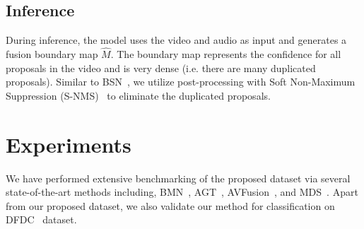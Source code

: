 \documentclass[conference, a4paper]{IEEEtran}
\makeatletter
\newcommand*{\ie}{i.e.\@\xspace}
\makeatother
\begin{document}
\begin{table*}
\centering
\caption{\textbf{Temporal forgery localization results on the subset (see Section~\ref{sec:experiments} for details) of the proposed dataset.} The visual-only version of the proposed method uses the output from the video boundary matching layer (see Figure~\ref{fig:model} for details), showing the performance when using only the video modality.}
\label{tab:subset}
\end{table*}    

\subsection{Inference}
During inference, the model uses the video and audio as input and generates a fusion boundary map $\hat{M}$. The boundary map represents the confidence for all proposals in the video and is very dense (\ie there are many duplicated proposals). Similar to BSN~\cite{lin_bsn_2018}, we utilize post-processing with Soft Non-Maximum Suppression (S-NMS)~\cite{bodla_soft-nms_2017} to eliminate the duplicated proposals.

\section{Experiments}
\label{sec:experiments}
We have performed extensive benchmarking of the proposed dataset via several state-of-the-art methods including, BMN~\cite{lin_bmn_2019}, AGT~\cite{nawhal_activity_2021}, AVFusion~\cite{bagchi_hear_2021}, and MDS~\cite{chugh_not_2020}. Apart from our proposed dataset, we also validate our method for classification on DFDC~\cite{dolhansky_deepfake_2020} dataset.
\end{document}
